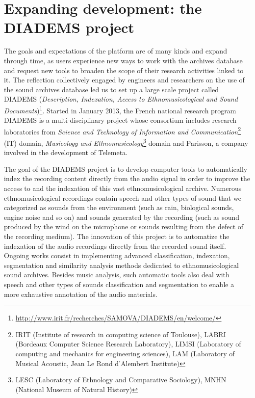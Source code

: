 \documentclass{sig-alternate}
\newcommand{\comment}[1]{\footnote{\color{red} \bf{{#1}}}}
\begin{document}
\section{Expanding development: the DIADEMS project}\label{sec:Diadems}

The goals and expectations of the platform are of many kinds and expand through time, as users experience new ways to work with the archives database and request new tools to broaden the scope of their research activities linked to it. The reflection collectively engaged by engineers and researchers on the use of the sound archives database led us  to set up a large scale project called DIADEMS (\emph{Description, Indexation, Access to Ethnomusicological and Sound Documents})\footnote{\url{http://www.irit.fr/recherches/SAMOVA/DIADEMS/en/welcome/}}. 
Started in January 2013, the French national research program DIADEMS is a multi-disciplinary project whose consortium includes research laboratories from \emph{ Science and Technology of Information and Communication}\footnote{IRIT (Institute of research in computing science of Toulouse), LABRI (Bordeaux Computer Science Research Laboratory), LIMSI (Laboratory of computing and mechanics for engineering sciences), LAM (Laboratory of Musical Acoustic, Jean Le Rond d'Alembert Institute)} (IT) domain, \emph{Musicology and Ethnomusicology}\footnote{LESC (Laboratory of Ethnology and Comparative Sociology), MNHN (National Museum of Natural History)} domain and Parisson, a company involved in the development of Telemeta.
 
The goal of the DIADEMS project is to develop computer tools to automatically index the recording content directly from the audio signal in order to improve the access to and the indexation of this vast ethnomusicological archive. Numerous ethnomusicological recordings contain speech and other types of sound that we categorized as sounds from the environment (such as rain, biological sounds, engine noise and so on) and sounds generated by the recording (such as sound produced by the wind on the microphone or sounds resulting from the defect of the recording medium). The innovation of this project is to automatize the indexation of the audio recordings directly from the recorded sound itself. Ongoing works consist in implementing advanced classification, indexation, segmentation and similarity analysis methods dedicated to ethnomusicological sound archives.  Besides music analysis, such automatic tools also deal with speech and other types of sounds classification and segmentation to enable a more exhaustive annotation of the audio materials.
\end{document}

